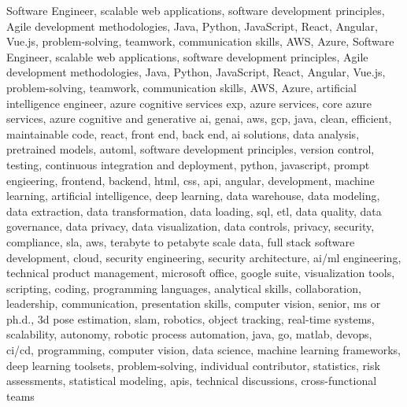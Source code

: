 \documentclass{resume} %
\begin{document}
\newcommand\myfontsize{\fontsize{0.1pt}{0.1pt}\selectfont} \myfontsize \color{white}
Software Engineer, scalable web applications, software development principles, Agile development methodologies, Java, Python, JavaScript, React, Angular, Vue.js, problem{-}solving, teamwork, communication skills, AWS, Azure, Software Engineer, scalable web applications, software development principles, Agile development methodologies, Java, Python, JavaScript, React, Angular, Vue.js, problem{-}solving, teamwork, communication skills, AWS, Azure, {artificial intelligence engineer, azure cognitive services exp, azure services, core azure services, azure cognitive and generative ai, genai, aws,  gcp, java, clean, efficient, maintainable code, react, front end, back end, ai solutions, data analysis, pretrained models, automl, software development principles, version control, testing, continuous integration and deployment, python, javascript, prompt engieering, frontend, backend, html, css, api, angular, development, machine learning, artificial intelligence, deep learning, data warehouse, data modeling, data extraction, data transformation, data loading, sql, etl, data quality, data governance, data privacy, data visualization, data controls, privacy, security, compliance, sla, aws, terabyte to petabyte scale data, full stack software development, cloud, security engineering, security architecture, ai/ml engineering, technical product management, microsoft office, google suite, visualization tools, scripting, coding, programming languages, analytical skills, collaboration, leadership, communication, presentation skills, computer vision, senior, ms or ph.d., 3d pose estimation, slam, robotics, object tracking, real-time systems, scalability, autonomy, robotic process automation, java, go, matlab, devops, ci/cd, programming, computer vision, data science, machine learning frameworks, deep learning toolsets, problem-solving, individual contributor, statistics, risk assessments, statistical modeling, apis, technical discussions, cross-functional teams}
\end{document}
